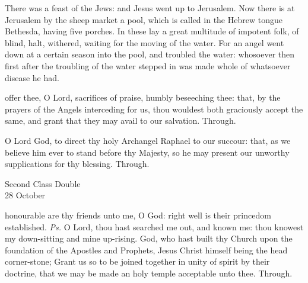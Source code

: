  There was a feast of the Jews: and Jesus went up to Jerusalem. Now there is at Jerusalem by the sheep market a pool, which is called in the Hebrew tongue Bethesda, having five porches. In these lay a great multitude of impotent folk, of blind, halt, withered, waiting for the moving of the water. For an angel went down at a certain season into the pool, and troubled the water: whosoever then first after the troubling of the water stepped in was made whole of whatsoever disease he had.


\secret
{} offer thee, O Lord, sacrifices of praise, humbly beseeching thee: that, by the prayers of the Angels interceding for us, thou wouldest both graciously accept the same, and grant that they may avail to our salvation. Through.


\postcommunion
{} O Lord God, to direct thy holy Archangel Raphael to our succour: that, as we believe him ever to stand before thy Majesty, so he may present our unworthy supplications for thy blessing. Through.


\begin{inhead}
    {Second Class Double\\
28 October}
\end{inhead}

\introit
{} honourable are thy friends unto me, O God: right well is their princedom established. \textit{Ps.} O Lord, thou hast searched me out, and known me: thou knowest my down-sitting and mine up-rising.
\collect
{} God, who hast built thy Church upon the foundation of the Apostles and Prophets, Jesus Christ himself being the head corner-stone; Grant us so to be joined together in unity of spirit by their doctrine, that we may be made an holy temple acceptable unto thee. Through.

